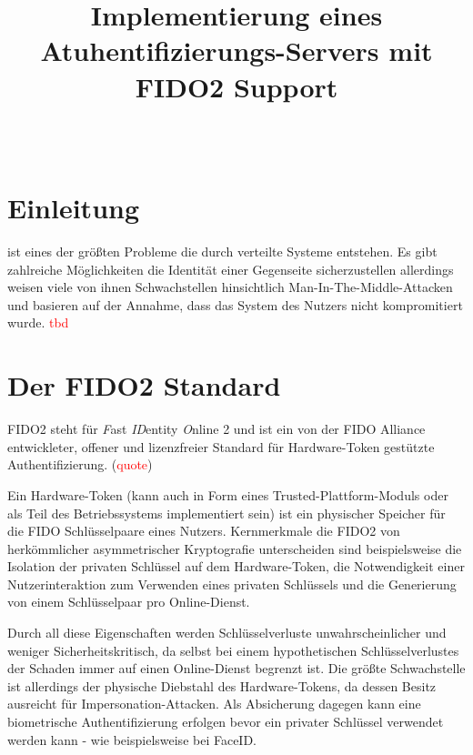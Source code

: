 \documentclass[journal]{IEEEtran}
\title{Implementierung eines Atuhentifizierungs-Servers mit FIDO2 Support}
\author{
	\IEEEauthorblockN{Mara Schulke \textit{(Matrikel-Nr. 20215853)}}\\
	\IEEEauthorblockA{
		Technische Hochschule Brandenburg \\
		B.Sc. IT Sicherheit \\
		Hardware Sicherheit
	}
}
\begin{document}

\maketitle

\begin{abstract}
\end{abstract}

\section{Einleitung}
 ist eines der größten
Probleme die durch verteilte Systeme entstehen. Es gibt zahlreiche
Möglichkeiten die Identität einer Gegenseite sicherzustellen allerdings weisen
viele von ihnen Schwachstellen hinsichtlich Man-In-The-Middle-Attacken und
basieren auf der Annahme, dass das System des Nutzers nicht kompromitiert
wurde. \textcolor{red}{tbd}

\section{Der FIDO2 Standard}

FIDO2 steht für \textit{F}ast \textit{ID}entity \textit{O}nline 2 und ist ein von
der FIDO Alliance entwickleter, offener und lizenzfreier Standard für
Hardware-Token gestützte Authentifizierung. (\textcolor{red}{quote})

Ein Hardware-Token (kann auch in Form eines Trusted-Plattform-Moduls oder als
Teil des Betriebssystems implementiert sein) ist ein physischer Speicher für
die FIDO Schlüsselpaare eines Nutzers. Kernmerkmale die FIDO2 von
herkömmlicher asymmetrischer Kryptografie unterscheiden sind beispielsweise die
Isolation der privaten Schlüssel auf dem Hardware-Token, die Notwendigkeit
einer Nutzerinteraktion zum Verwenden eines privaten Schlüssels und die
Generierung von einem Schlüsselpaar pro Online-Dienst.

Durch all diese Eigenschaften werden Schlüsselverluste unwahrscheinlicher und
weniger Sicherheitskritisch, da selbst bei einem hypothetischen
Schlüsselverlustes der Schaden immer auf einen Online-Dienst begrenzt ist.
Die größte Schwachstelle ist allerdings der physische Diebstahl des
Hardware-Tokens, da dessen Besitz ausreicht für Impersonation-Attacken. Als
Absicherung dagegen kann eine biometrische Authentifizierung erfolgen bevor ein
privater Schlüssel verwendet werden kann - wie beispielsweise bei FaceID.\
\end{document}
